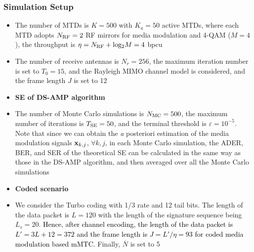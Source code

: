 \documentclass[9pt]{beamer}
\let \it = \textit
\begin{document}
\begin{frame}
\frametitle{Simulation Setup}
\begin{itemize}
\item
The number of MTDs is $K=500$ with $K_a=50$ active MTDs, where each MTD adopts $N_{\rm RF}=2$ RF mirrors for media modulation and 4-QAM ($M=4$), the throughput is $\eta=N_{\rm RF}+{\rm log_2}M=4$ bpcu
\item
The number of receive antennas is $N_r=256$, the maximum iteration number is set to $T_0=15$, and the Rayleigh MIMO channel model is considered, and the frame length $J$ is set to 12
\item
{\bf SE of DS-AMP algorithm}
\item
The number of Monte Carlo simulations is $N_{\rm MC}=500$, the maximum number of iterations is $T_{\rm SE}=50$, and the terminal threshold is $\varepsilon=10^{-5}$. Note that since we can obtain the {\it a posteriori} estimation of the media modulation signals ${\bf x}_{k,j}$, $\forall k,j$, in each Monte Carlo simulation, the ADER, BER, and SER of the theoretical SE can be calculated in the same way as those in the DS-AMP algorithm, and then averaged over all the Monte Carlo simulations
\item
{\bf Coded scenario}
\item
We consider the Turbo coding with 1/3 rate and 12 tail bits. The length of the data packet is $L=120$ with the length of the signature sequence being $L_s=20$. \textcolor{black}{Hence, after channel encoding, the length of the data packet is $L'=3L+12=372$ and the frame length is $J=L'/ \eta=93$ for coded media modulation based mMTC.} Finally, $\overline{N}$ is set to 5
\end{itemize}
\end{frame}
\end{document}

